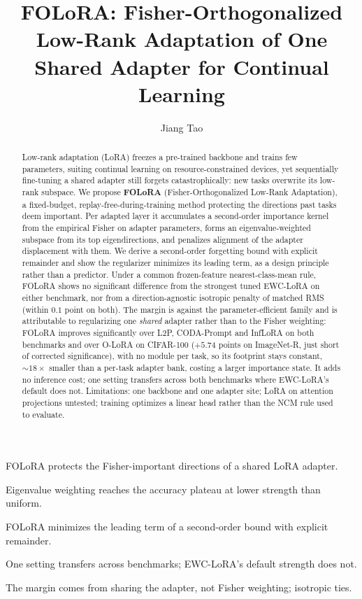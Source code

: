 \documentclass[review,12pt]{elsarticle}
\begin{document}
\begin{frontmatter}

\title{FOLoRA: Fisher-Orthogonalized Low-Rank Adaptation of One Shared Adapter for Continual Learning}

\begin{highlights}
\item FOLoRA protects the Fisher-important directions of a shared LoRA adapter.
\item Eigenvalue weighting reaches the accuracy plateau at lower strength than uniform.
\item FOLoRA minimizes the leading term of a second-order bound with explicit remainder.
\item One setting transfers across benchmarks; EWC-LoRA's default strength does not.
\item The margin comes from sharing the adapter, not Fisher weighting; isotropic ties.
\end{highlights}

\author[hufe]{Jiang Tao}
\address[hufe]{School of Intelligent Information Engineering, Heilongjiang University of Finance and Economics, Harbin, China}

\begin{abstract}
Low-rank adaptation (LoRA) freezes a pre-trained backbone and trains few parameters,
suiting continual learning on resource-constrained devices, yet sequentially fine-tuning a
shared adapter still forgets catastrophically: new tasks overwrite its low-rank subspace.
We propose \textbf{FOLoRA} (Fisher-Orthogonalized Low-Rank Adaptation), a fixed-budget,
replay-free-during-training method protecting the directions past tasks deem important. Per
adapted layer it accumulates a second-order importance kernel from the empirical Fisher on
adapter parameters, forms an eigenvalue-weighted subspace from its top eigendirections, and
penalizes alignment of the adapter displacement with them. We derive a second-order
forgetting bound with explicit remainder and show the regularizer minimizes its leading
term, as a design principle rather than a predictor. Under a common frozen-feature
nearest-class-mean rule, FOLoRA shows no significant difference from the strongest tuned
EWC-LoRA on either benchmark, nor from a direction-agnostic isotropic penalty of matched RMS
(within $0.1$ point on both). The margin is against the parameter-efficient family and
is attributable to regularizing one \emph{shared} adapter rather than to the Fisher
weighting: FOLoRA improves significantly over L2P, CODA-Prompt and InfLoRA on both
benchmarks and over O-LoRA on CIFAR-100 ($+5.74$ points on ImageNet-R, just short of
corrected significance), with no module per task, so its footprint stays constant,
$\sim18\times$ smaller than a per-task adapter bank, costing a larger importance state. It adds no inference cost; one setting transfers across both benchmarks where
EWC-LoRA's default does not. Limitations: one backbone and one adapter site; LoRA on
attention projections untested; training optimizes a linear head rather than the NCM rule
used to evaluate.
\end{abstract}


\end{frontmatter}
\end{document}
